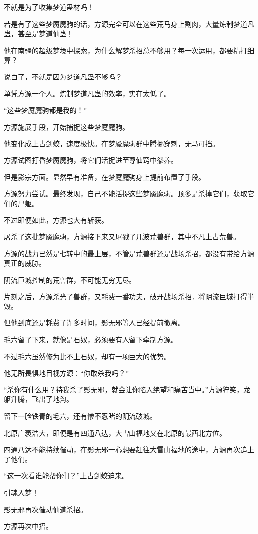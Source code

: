 \begin{this_body}
不就是为了收集梦道蛊材吗！

若是有了这些梦魇魔驹的话，方源完全可以在这些荒马身上割肉，大量炼制梦道凡蛊，甚至是梦道仙蛊！

他在南疆的超级梦境中探索，为什么解梦杀招总不够用？每一次运用，都要精打细算？

说白了，不就是因为梦道凡蛊不够吗？

单凭方源一个人。炼制梦道凡蛊的效率，实在太低了。

“这些梦魇魔驹都是我的！”

方源施展手段，开始捕捉这些梦魇魔驹。

他变化成上古剑蛟，速度极快。在梦魇魔驹群中腾挪穿刺，无马可挡。

方源试图打昏梦魇魔驹，将它们活捉进至尊仙窍中豢养。

但是影宗方面。显然早有准备，在梦魇魔驹身上提前布置了手段。

方源努力尝试。最终发现，自己不能活捉这些梦魇魔驹。顶多是杀掉它们，获取它们的尸躯。

不过即便如此，方源也大有斩获。

屠杀了这批梦魇魔驹，方源接下来又屠戮了几波荒兽群，其中不凡上古荒兽。

方源的战力已然是七转中的最上层，不管是荒兽群还是战场杀招，都没有带给方源真正的威胁。

阴流巨城控制的荒兽群，不可能无穷无尽。

片刻之后，方源杀光了兽群，又耗费一番功夫，破开战场杀招，将阴流巨城打得半毁。

但他到底还是耗费了许多时间，影无邪等人已经提前撤离。

毛六留了下来，就像是石奴，必须要有人留下牵制方源。

不过毛六虽然修为比不上石奴，却有一项巨大的优势。

他无所畏惧地目视方源：“你敢杀我吗？”

“杀你有什么用？待我杀了影无邪，就会让你陷入绝望和痛苦当中。”方源狞笑，龙躯升腾，飞出了地沟。

留下一脸铁青的毛六，还有惨不忍睹的阴流破城。

北原广袤浩大，即便是有四通八达，大雪山福地又在北原的最西北方位。

四通八达不能持续催动，在影无邪一心想要赶往大雪山福地的途中，方源再次追上了他们。

“这一次看谁能帮你们？”上古剑蛟迫来。

引魂入梦！

影无邪再次催动仙道杀招。

方源再次中招。


\end{this_body}
